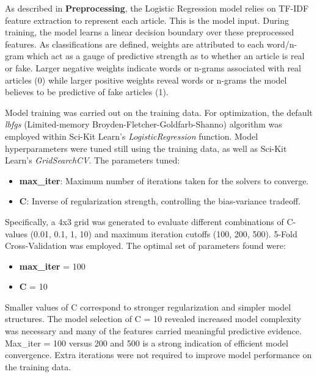 \documentclass{article}
\begin{document}
As described in \textbf{Preprocessing}, the Logistic Regression model relies on TF-IDF feature extraction to represent each article. This is the model input. During training, the model learns a linear decision boundary over these preprocessed features. As classifications are defined, weights are attributed to each word/n-gram which act as a gauge of predictive strength as to whether an article is real or fake. Larger negative weights indicate words or n-grams associated with real articles (0) while larger positive weights reveal words or n-grams the model believes to be predictive of fake articles (1).

Model training was carried out on the training data. For optimization, the default {\it lbfgs} (Limited-memory Broyden-Fletcher-Goldfarb-Shanno) algorithm was employed within Sci-Kit Learn's {\it LogisticRegression} function. Model hyperparameters were tuned still using the training data, as well as Sci-Kit Learn’s {\it GridSearchCV}. The parameters tuned:
\begin{itemize}
    \item \textbf{max\_iter}: Maximum number of iterations taken for the solvers to converge.

    \item \textbf{C}: Inverse of regularization strength, controlling the bias-variance tradeoff.
    
\end{itemize}

Specifically, a 4x3 grid was generated to evaluate different combinations of C-values (0.01, 0.1, 1, 10) and maximum iteration cutoffs (100, 200, 500). 5-Fold Cross-Validation was employed. The optimal set of parameters found were:

\begin{itemize}
    \item \textbf{max\_iter} = 100

    \item \textbf{C} = 10
    
\end{itemize}

Smaller values of C correspond to stronger regularization and simpler model structures. The model selection of C = 10 revealed increased model complexity was necessary and many of the features carried meaningful predictive evidence. Max\_iter = 100 versus 200 and 500 is a strong indication of efficient model convergence. Extra iterations were not required to improve model performance on the training data. 
\end{document}
